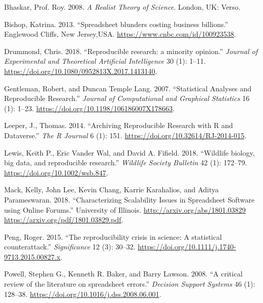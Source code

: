 \documentclass[smallextended]{svjour3}       %
\newlength{\cslhangindent}
\newlength{\cslentryspacingunit} %
\newenvironment{CSLReferences}[2] %
 {%
  \setlength{\parindent}{0pt}
  \ifodd #1
  \let\oldpar\par
  \def\par{\hangindent=\cslhangindent\oldpar}
  \fi
  \setlength{\parskip}{#2\cslentryspacingunit}
 }%
 {}
\begin{document}
\hypertarget{refs}{}
\begin{CSLReferences}{1}{0}
\leavevmode{}%
Bhaskar, Prof. Roy. 2008. \emph{{A Realist Theory of Science}}. London, UK: Verso.

\leavevmode{}%
Bishop, Katrina. 2013. {``{Spreadsheet blunders costing business billions}.''} Englewood Cliffs, New Jersey,USA. \url{https://www.cnbc.com/id/100923538}.

\leavevmode{}%
Drummond, Chris. 2018. {``{Reproducible research: a minority opinion}.''} \emph{Journal of Experimental and Theoretical Artificial Intelligence} 30 (1): 1--11. \url{https://doi.org/10.1080/0952813X.2017.1413140}.

\leavevmode{}%
Gentleman, Robert, and Duncan Temple Lang. 2007. {``{Statistical Analyses and Reproducible Research}.''} \emph{Journal of Computational and Graphical Statistics} 16 (1): 1--23. \url{https://doi.org/10.1198/106186007X178663}.

\leavevmode{}%
Leeper, J., Thomas. 2014. {``{Archiving Reproducible Research with R and Dataverse}.''} \emph{The R Journal} 6 (1): 151. \url{https://doi.org/10.32614/RJ-2014-015}.

\leavevmode{}%
Lewis, Keith P., Eric Vander Wal, and David A. Fifield. 2018. {``{Wildlife biology, big data, and reproducible research}.''} \emph{Wildlife Society Bulletin} 42 (1): 172--79. \url{https://doi.org/10.1002/wsb.847}.

\leavevmode{}%
Mack, Kelly, John Lee, Kevin Chang, Karrie Karahalios, and Aditya Parameswaran. 2018. {``{Characterizing Scalability Issues in Spreadsheet Software using Online Forums}.''} University of Illinois. \href{http://arxiv.org/abs/1801.03829\%20https://arxiv.org/pdf/1801.03829.pdf}{http://arxiv.org/abs/1801.03829 https://arxiv.org/pdf/1801.03829.pdf}.

\leavevmode{}%
Peng, Roger. 2015. {``{The reproducibility crisis in science: A statistical counterattack}.''} \emph{Significance} 12 (3): 30--32. \url{https://doi.org/10.1111/j.1740-9713.2015.00827.x}.

\leavevmode{}%
Powell, Stephen G., Kenneth R. Baker, and Barry Lawson. 2008. {``{A critical review of the literature on spreadsheet errors}.''} \emph{Decision Support Systems} 46 (1): 128--38. \url{https://doi.org/10.1016/j.dss.2008.06.001}.


\end{CSLReferences}
\end{document}
